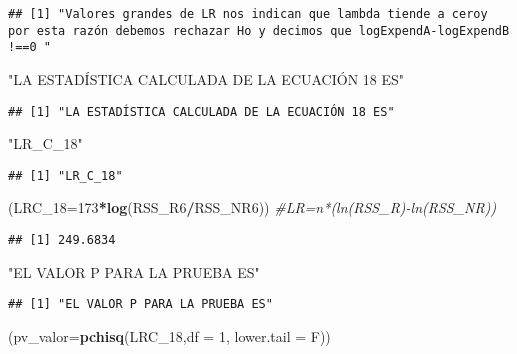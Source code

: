 \documentclass[
]{article}
\newenvironment{Shaded}{\begin{snugshade}}{\end{snugshade}}
\newcommand{\CommentTok}[1]{\textcolor[rgb]{0.56,0.35,0.01}{\textit{#1}}}
\newcommand{\DataTypeTok}[1]{\textcolor[rgb]{0.13,0.29,0.53}{#1}}
\newcommand{\DecValTok}[1]{\textcolor[rgb]{0.00,0.00,0.81}{#1}}
\newcommand{\KeywordTok}[1]{\textcolor[rgb]{0.13,0.29,0.53}{\textbf{#1}}}
\newcommand{\NormalTok}[1]{#1}
\newcommand{\OperatorTok}[1]{\textcolor[rgb]{0.81,0.36,0.00}{\textbf{#1}}}
\newcommand{\StringTok}[1]{\textcolor[rgb]{0.31,0.60,0.02}{#1}}
\begin{document}
\begin{verbatim}
## [1] "Valores grandes de LR nos indican que lambda tiende a ceroy por esta razón debemos rechazar Ho y decimos que logExpendA-logExpendB !==0 "
\end{verbatim}

\begin{Shaded}
\begin{Highlighting}[]
\StringTok{"LA ESTADÍSTICA CALCULADA DE LA ECUACIÓN 18 ES"}
\end{Highlighting}
\end{Shaded}

\begin{verbatim}
## [1] "LA ESTADÍSTICA CALCULADA DE LA ECUACIÓN 18 ES"
\end{verbatim}

\begin{Shaded}
\begin{Highlighting}[]
\StringTok{"LR_C_18"}
\end{Highlighting}
\end{Shaded}

\begin{verbatim}
## [1] "LR_C_18"
\end{verbatim}

\begin{Shaded}
\begin{Highlighting}[]
\NormalTok{(}\DataTypeTok{LRC_18=}\DecValTok{173}\OperatorTok{*}\KeywordTok{log}\NormalTok{(RSS_R6}\OperatorTok{/}\NormalTok{RSS_NR6))  }\CommentTok{#LR=n*(ln(RSS_R)-ln(RSS_NR))}
\end{Highlighting}
\end{Shaded}

\begin{verbatim}
## [1] 249.6834
\end{verbatim}

\begin{Shaded}
\begin{Highlighting}[]
\StringTok{"EL VALOR P PARA LA PRUEBA ES"}
\end{Highlighting}
\end{Shaded}

\begin{verbatim}
## [1] "EL VALOR P PARA LA PRUEBA ES"
\end{verbatim}

\begin{Shaded}
\begin{Highlighting}[]
\NormalTok{(}\DataTypeTok{pv_valor=}\KeywordTok{pchisq}\NormalTok{(LRC_}\DecValTok{18}\NormalTok{,}\DataTypeTok{df =} \DecValTok{1}\NormalTok{, }\DataTypeTok{lower.tail =}\NormalTok{ F))}
\end{Highlighting}
\end{Shaded}
\end{document}
